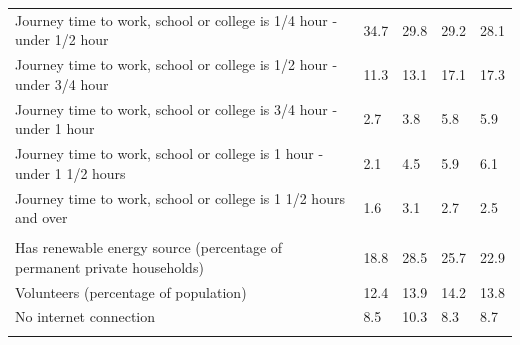 \documentclass{article}
\begin{document}
\begin{table}[h]
\begin{tabular}{KTTTT}
Journey time to work, school or college is 1/4 hour - under 1/2 hour & 34.7& 29.8& 29.2& 28.1\\
Journey time to work, school or college is 1/2 hour - under 3/4 hour & 11.3& 13.1& 17.1& 17.3\\
Journey time to work, school or college is 3/4 hour - under 1 hour & 2.7& 3.8& 5.8& 5.9\\
Journey time to work, school or college is 1 hour - under 1 1/2 hours & 2.1& 4.5& 5.9& 6.1\\
Journey time to work, school or college is 1 1/2 hours and over & 1.6& 3.1& 2.7& 2.5\\
\hline
    \\ 
    \hline
Has renewable energy source (percentage of permanent private households) & 18.8& 28.5& 25.7& 22.9\\
    \hline
Volunteers (percentage of population) & 12.4& 13.9& 14.2& 13.8\\
    \hline
No internet connection&  8.5& 10.3&  8.3&  8.7\\
\hline
\end{tabular}
\end{table}
\end{document}
